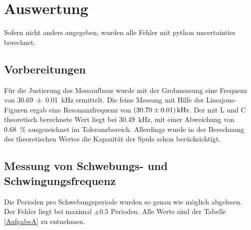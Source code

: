 \documentclass[11pt,ngerman,a4paper]{article}
\begin{document}
\section{Auswertung}


Sofern nicht anders angegeben, wurden alle Fehler mit python uncertainties berechnet.
\subsection{Vorbereitungen}
Für die Justierung des Messaufbaus wurde mit der Grobmessung eine Frequenz von \SI{30,69+-0,01}{\kilo\hertz} ermittelt. Die feine Messung mit Hilfe der Lissajous-Figuren ergab eine Resonanzfrequenz von $\SI{30,70+-0,01}{\kilo\hertz}$. Der mit L und C theoretisch berechnete Wert liegt bei \SI{30,49}{\kilo\hertz}, mit einer Abweichung von \SI{0,68}{\percent} ausgezeichnet im Toleranzbereich. Allerdings wurde in der Berechnung des theoretischen Wertes die Kapazität der Spule schon berücksichtigt.
\subsection{Messung von Schwebungs- und Schwingungsfrequenz}
Die Perioden pro Schwebungsperiode wurden so genau wie möglich abgelesen. Der Fehler liegt bei maximal $\pm 0.5$ Perioden. Alle Werte sind der Tabelle \ref{AufgabeA} zu entnehmen.
\end{document}
